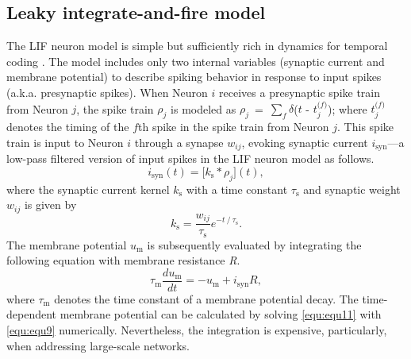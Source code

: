 \documentclass[10pt,journal]{IEEEtran}
\begin{document}
\subsection{Leaky integrate-and-fire model}
The LIF neuron model is simple but sufficiently rich in dynamics for temporal coding \cite{gerstner2002spiking}. 
The model includes only two internal variables (synaptic current and membrane potential) to describe spiking behavior in response to input spikes (a.k.a. presynaptic spikes). 
When Neuron $i$ receives a presynaptic spike train from Neuron $j$, the spike train $\rho_j$ is modeled as 
$\rho_j$~=~$\sum_f\delta$\big($t$ - $t_j^{\textrm{(}f\textrm{)}}$\big); where $t_j^{\textrm{(}f\textrm{)}}$ denotes the timing of the $f$th spike in the spike train from Neuron $j$. 
This spike train is input to Neuron $i$ through a synapse $w_{ij}$, evoking synaptic current $i_\textrm{syn}$---a low-pass filtered version of input spikes in the LIF neuron model as follows.
\begin{equation}\label{equ:equ9}
    i_\textrm{syn}(t) = \big[k_\textrm{s} \ast \rho_j \big](t),		
\end{equation}
where the synaptic current kernel $k_\textrm{s}$ with a time constant $\tau_\textrm{s}$ and synaptic weight $w_{ij}$ is given by 
\begin{equation}\label{equ:equ10}
    k_\textrm{s} = \frac{w_{ij}}{\tau_\textrm{s}} e^{-t\mathbin{/}\tau_\textrm{s}}.		
\end{equation}
The membrane potential $u_\textrm{m}$ is subsequently evaluated by integrating the following equation with membrane resistance \textit{R}.
\begin{equation}\label{equ:equ11}
    \tau_\textrm{m}\frac{du_\textrm{m}}{dt}=-u_\textrm{m}+i_\textrm{syn}\textit{R},	
\end{equation}
where $\tau_\textrm{m}$ denotes the time constant of a membrane potential decay. 
The time-dependent membrane potential can be calculated by solving \eqref{equ:equ11} with \eqref{equ:equ9} numerically.
Nevertheless, the integration is expensive, particularly, when addressing large-scale networks.
\end{document}
